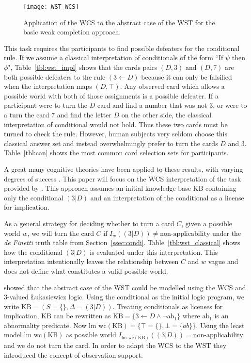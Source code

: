 \begin{sidewaysfigure}
\centering \texttt{[image: WST\_WCS]}
\caption{Application of the WCS to the abstract case of the WST for the basic weak completion approach.}
\label{wst_wcs}
\end{sidewaysfigure}

This task requires the participants to find possible defeaters for the conditional rule. If we assume a classical interpretation of conditionals of the form ``If $\psi$ then $\phi$", Table~\ref{tbl:wst_impl} shows that the cards pairs $(D,3)$ and $(D,7)$ are both possible defeaters to the rule $(3 \leftarrow D)$ because it can only be falsified when the interpretation maps $(D,\top)$. Any observed card which allows a possible world with both of those assignments is a possible defeater. If a participant were to turn the $D$ card and find a number that was not $3$, or were to a turn the card $7$ and find the letter $D$ on the other side, the classical interpretation of conditional would not hold. Thus these two cards must be turned to check the rule. However, human subjects very seldom choose this classical answer set and instead overwhelmingly prefer to turn the cards $D$ and $3$. Table~\ref{tbl:can} shows the most common card selection sets for participants.

A great many cognitive theories have been applied to these results, with varying degrees of success \citep{ragni2017formal}. This paper will focus on the WCS interpretation of the task provided by \cite{ragni2017wason}. This approach assumes an initial knowledge base $\text{KB}$ containing only the conditional $(3|D)$ and an interpretation of the conditional as a license for implication.

As a general strategy for deciding whether to turn a card $C$, given a possible world $w$, we will turn the card $C$ if $I_w((3|D))\neq \text{non-applicability}$ under the \textit{de Finetti} truth table from Section~\ref{ssec:condi}. Table~\ref{tbl:wst_classical} shows how the conditional $(3|D)$ is evaluated under this interpretation. This interpretation intentionally leaves the relationship between $C$ and $w$ vague and does not define what constitutes a valid possible world.

\cite{dietz2012computational} showed that the abstract case of the WST could be modelled using the WCS and 3-valued \L ukasiewicz logic. Using the conditional as the initial logic program, we write $\text{KB}=(S=\{\},\Delta=(3|D))$. Treating conditionals as licenses for implication, $\text{KB}$ can be rewritten as $\text{KB}=\{3\leftarrow D \land \lnot \text{ab}_1\}$ where $\text{ab}_1$ is an abnormality predicate. Now $\textrm{lm wc}(\text{KB})=\{\top=\{\},\bot=\{ab\}\}$. Using the least model $\textrm{lm wc}(\text{KB})$ as possible world $I_{\textrm{lm wc}(\text{KB})}((3|D))=\text{non-applicability}$ and we do not turn the card. In order to adapt the WCS to the WST they introduced the concept of observation support.

